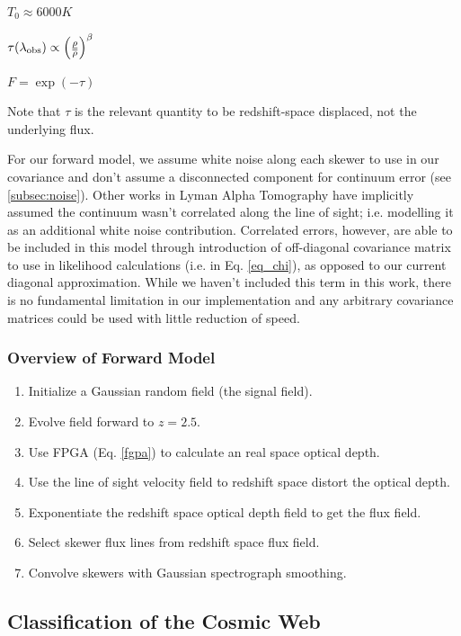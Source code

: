 \documentclass[times]{aastex62}
\begin{document}
$T_0 \approx 6000 K$


$\tau(\lambda_{\rm obs}) \propto \left(\frac{\rho}{\overline \rho}\right)^\beta$

$F = \exp\left(-\tau\right)$

Note that $\tau$ is the relevant quantity to be redshift-space displaced, not the underlying flux. 


For our forward model, we assume white noise along each skewer to use in our covariance and don't assume a disconnected component for continuum error (see \ref{subsec:noise}). Other works in Lyman Alpha Tomography have implicitly assumed the continuum wasn't correlated along the line of sight; i.e. modelling it as an additional white noise contribution. Correlated errors, however, are able to be included in this model through introduction of off-diagonal covariance matrix to use in likelihood calculations (i.e. in Eq. \ref{eq_chi}), as opposed to our current diagonal approximation. While we haven't included this term in this work, there is no fundamental limitation in our implementation and any arbitrary covariance matrices could be used with little reduction of speed. 

\subsubsection{Overview of Forward Model}

\begin{enumerate}
\item Initialize a Gaussian random field (the signal field).
\item Evolve field forward to $z = 2.5$.
\item Use FPGA (Eq. \ref{fgpa}) to calculate an real space optical depth.
\item Use the line of sight velocity field to redshift space distort the optical depth.
\item Exponentiate the redshift space optical depth field to get the flux field.
\item Select skewer flux lines from redshift space flux field.
\item Convolve skewers with Gaussian spectrograph smoothing.
\end{enumerate}

\subsection{Classification of the Cosmic Web}
\end{document}
